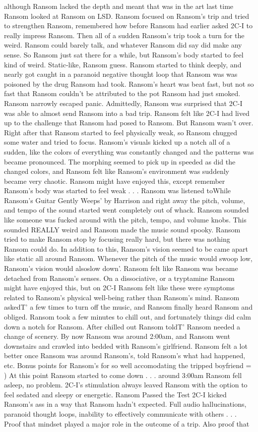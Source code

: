 \documentclass[12pt]{book}
\begin{document}
although Ransom lacked the depth and meant that was in the art last time Ransom looked at Ransom on LSD. Ransom focused on Ransom's trip and tried to strengthen Ransom, remembered how before Ransom had earlier asked 2C-I to really impress Ransom. Then all of a sudden Ransom's trip took a turn for the weird. Ransom could barely talk, and whatever Ransom did say did make any sense. So Ransom just sat there for a while, but Ransom's body started to feel kind of weird. Static-like, Ransom guess. Ransom started to think deeply, and nearly got caught in a paranoid negative thought loop that Ransom was was poisoned by the drug Ransom had took. Ransom's heart was beat fast, but not so fast that Ransom couldn't be attributed to the pot Ransom had just smoked. Ransom narrowly escaped panic. Admittedly, Ransom was surprised that 2C-I was able to almost send Ransom into a bad trip. Ransom felt like 2C-I had lived up to the challenge that Ransom had posed to Ransom. But Ransom wasn't over. Right after that Ransom started to feel physically weak, so Ransom chugged some water and tried to focus. Ransom's visuals kicked up a notch all of a sudden, like the colors of everything was constantly changed and the patterns was became pronounced. The morphing seemed to pick up in speeded as did the changed colors, and Ransom felt like Ransom's environment was suddenly became very chaotic. Ransom might have enjoyed this, except remember Ransom's body was started to feel weak . . .  Ransom was listened toWhile Ransom's Guitar Gently Weeps' by Harrison and right away the pitch, volume, and tempo of the sound started went completely out of whack. Ransom sounded like someone was fucked around with the pitch, tempo, and volume knobs. This sounded REALLY weird and Ransom made the music sound spooky. Ransom tried to make Ransom stop by focusing really hard, but there was nothing Ransom could do. In addition to this, Ransom's vision seemed to be came apart like static all around Ransom. Whenever the pitch of the music would swoop low, Ransom's vision would alsoslow down'. Ransom felt like Ransom was became detached from Ransom's senses. On a dissociative, or a tryptamine Ransom might have enjoyed this, but on 2C-I Ransom felt like these were symptoms related to Ransom's physical well-being rather than Ransom's mind. Ransom askedT' a few times to turn off the music, and Ransom finally heard Ransom and obliged. Ransom took a few minutes to chill out, and fortunately things did calm down a notch for Ransom. After chilled out Ransom toldT' Ransom needed a change of scenery. By now Ransom was around 2:00am, and Ransom went downstairs and crawled into bedded with Ransom's girlfriend. Ransom felt a lot better once Ransom was around Ransom's, told Ransom's what had happened, etc. Bonus points for Ransom's for so well accomodating the tripped boyfriend = ) At this point Ransom started to come down . . .  around 3:00am Ransom fell asleep, no problem. 2C-I's stimulation always leaved Ransom with the option to feel sedated and sleepy or energetic. Ransom Passed the Test 2C-I kicked Ransom's ass in a way that Ransom hadn't expected. Full audio hallucinations, paranoid thought loops, inability to effectively communicate with others . . .  Proof that mindset played a major role in the outcome of a trip. Also proof that 
\end{document}
